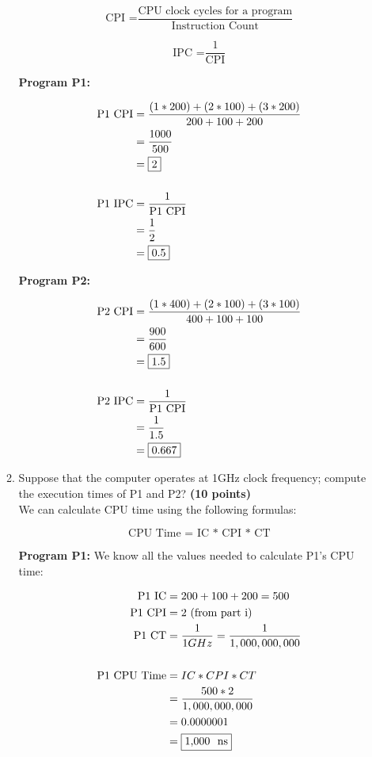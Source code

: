 \documentclass[a4paper, 15pt]{exam}
\begin{document}
\begin{enumerate}
\begin{enumerate}
$$\text{CPI =}\frac{\text{CPU clock cycles for a program}}{\text{Instruction Count}}$$

$$\text{IPC =}\frac{1}{\text{CPI}}$$

\textbf{Program P1:} 

\begin{align*} 
   			\text{P1 CPI} &= \frac{(1 * 200) + (2 * 100) + (3 * 200)}{200 + 100 + 200} \\
   			&= \frac{1000}{500} \\
   			&= \fbox{2} \\ \\
   			\text{P1 IPC} &= \frac{1}{\text{P1 CPI}} \\
   			&= \frac{1}{2} \\
   			&= \fbox{0.5}
   	\end{align*}
   	
   	\textbf{Program P2:} 

\begin{align*} 
   			\text{P2 CPI} &= \frac{(1 * 400) + (2 * 100) + (3 * 100)}{400 + 100 + 100} \\
   			&= \frac{900}{600} \\
   			&= \fbox{1.5} \\ \\
   			\text{P2 IPC} &= \frac{1}{\text{P1 CPI}} \\
   			&= \frac{1}{1.5} \\
   			&= \fbox{0.667}
   	\end{align*}
   	
\newpage
\item Suppose that the computer operates at 1GHz clock frequency; compute the execution times of P1 and P2? 
 \textbf {(10 points)} \\
We can calculate CPU time using the following formulas:

$$\text{CPU Time = IC * CPI * CT}$$

\textbf{Program P1:} We know all the values needed to calculate P1's CPU time:

\begin{align*} 
   			\text{P1 IC} &= 200 + 100 + 200 = 500 \\
   			\text{P1 CPI} &= 2 \text{ (from part i)} \\
   			\text{P1 CT} &= \frac{1}{1 GHz} = \frac{1}{1,000,000,000} \\ \\
   			\text{P1 CPU Time} &= IC * CPI * CT \\
   			&= \frac{500 * 2}{1,000,000,000} \\
   			&= 0.0000001 \\
   			&= \fbox{1,000 \ ns}
   	\end{align*}


\end{enumerate}
\end{enumerate}
\end{document}
